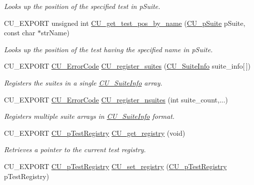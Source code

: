 \begin{DoxyCompactItemize}
\begin{DoxyCompactList}\small\item\em Looks up the position of the specified test in p\-Suite. \end{DoxyCompactList}\item 
C\-U\-\_\-\-E\-X\-P\-O\-R\-T unsigned int \hyperlink{group__Framework_ga0a271a736d6cc9403a4bc5c6f6ea29e3}{C\-U\-\_\-get\-\_\-test\-\_\-pos\-\_\-by\-\_\-name} (\hyperlink{group__Framework_gaba832ae8b235f5e70d6a4ac9c3bb1219}{C\-U\-\_\-p\-Suite} p\-Suite, const char $\ast$str\-Name)
\begin{DoxyCompactList}\small\item\em Looks up the position of the test having the specified name in p\-Suite. \end{DoxyCompactList}\item 
C\-U\-\_\-\-E\-X\-P\-O\-R\-T \hyperlink{group__Framework_ga743a2a025ee3eb792d7d85f0eea347e6}{C\-U\-\_\-\-Error\-Code} \hyperlink{group__Framework_ga331001da0a8bd8faececdb48e7ad3f96}{C\-U\-\_\-register\-\_\-suites} (\hyperlink{structCU__SuiteInfo}{C\-U\-\_\-\-Suite\-Info} suite\-\_\-info\mbox{[}$\,$\mbox{]})
\begin{DoxyCompactList}\small\item\em Registers the suites in a single \hyperlink{structCU__SuiteInfo}{C\-U\-\_\-\-Suite\-Info} array. \end{DoxyCompactList}\item 
C\-U\-\_\-\-E\-X\-P\-O\-R\-T \hyperlink{group__Framework_ga743a2a025ee3eb792d7d85f0eea347e6}{C\-U\-\_\-\-Error\-Code} \hyperlink{group__Framework_gaef02c65058bfe9f3adc320d536428588}{C\-U\-\_\-register\-\_\-nsuites} (int suite\-\_\-count,...)
\begin{DoxyCompactList}\small\item\em Registers multiple suite arrays in \hyperlink{structCU__SuiteInfo}{C\-U\-\_\-\-Suite\-Info} format. \end{DoxyCompactList}\item 
C\-U\-\_\-\-E\-X\-P\-O\-R\-T \hyperlink{group__Framework_ga2a416821761e04581a70c41ae3587d5c}{C\-U\-\_\-p\-Test\-Registry} \hyperlink{group__Framework_gacdc4bab7b0492ed1e3a4e076677de22e}{C\-U\-\_\-get\-\_\-registry} (void)
\begin{DoxyCompactList}\small\item\em Retrieves a pointer to the current test registry. \end{DoxyCompactList}\item 
C\-U\-\_\-\-E\-X\-P\-O\-R\-T \hyperlink{group__Framework_ga2a416821761e04581a70c41ae3587d5c}{C\-U\-\_\-p\-Test\-Registry} \hyperlink{group__Framework_gaaec6d8893d61bfff165775385851562d}{C\-U\-\_\-set\-\_\-registry} (\hyperlink{group__Framework_ga2a416821761e04581a70c41ae3587d5c}{C\-U\-\_\-p\-Test\-Registry} p\-Test\-Registry)

\end{DoxyCompactItemize}
